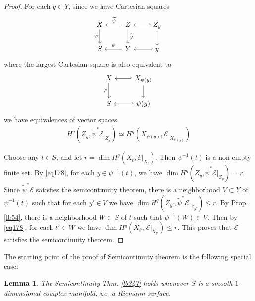 \documentclass[12pt,b5paper,notitlepage]{report}
\theoremstyle{definition}
\theoremstyle{plain}
\newtheorem{lm}[df]{Lemma}
\newcommand{\wtd}{\widetilde}
\newcommand{\scr}{\mathscr}
\numberwithin{equation}{section}
\begin{document}
\begin{proof}
For each $y\in Y$, since we have Cartesian squares
\begin{equation*}
\begin{tikzcd}
X \arrow[d, "\varphi"'] & Z \arrow[l, "\wtd\psi"'] \arrow[d, "\wtd\varphi"] & Z_y \arrow[d] \arrow[l,hook'] \\
S                       & Y \arrow[l, "\psi"']   &y \arrow[l,hook']                          
\end{tikzcd}
\end{equation*}
where the largest Cartesian square is also equivalent to
\begin{equation*}
\begin{tikzcd}
X \arrow[d, "\varphi"'] & X_{\psi(y)} \arrow[l, hook'] \arrow[d] \\
S                       & \psi(y) \arrow[l, hook']          
\end{tikzcd}
\end{equation*}
we have equivalences of vector spaces
\begin{align}
H^q(Z_y,\wtd\psi^*\scr E|_{Z_y})\simeq H^q(X_{\psi(y)},\scr E|_{X_{\psi(y)}})\label{eq178}
\end{align}

Choose any $t\in S$, and let $r=\dim H^q(X_t,\scr E|_{X_t})$. Then $\psi^{-1}(t)$ is a non-empty finite set. By \eqref{eq178}, for each $y\in\psi^{-1}(t)$, we have $\dim H^q(Z_y,\wtd\psi^*\scr E|_{Z_y})=r$. Since $\wtd\psi^*\scr E$ satisfies the semicontinuity theorem, there is a neighborhood $V\subset Y$ of $\psi^{-1}(t)$ such that for each $y'\in V$ we have $\dim H^q(Z_{y'},\wtd\psi^*\scr E|_{Z_{y'}})\leq r$. By Prop. \ref{lb54}, there is a neighborhood $W\subset S$ of $t$ such that $\psi^{-1}(W)\subset V$. Then by \eqref{eq178}, for each $t'\in W$ we have $\dim H^q(X_{t'},\scr E|_{X_{t'}})\leq r$. This proves that $\scr E$ satisfies the semicontinuity theorem.
\end{proof}



The starting point of the proof of Semicontinuity theorem is the following special case:


\begin{lm}\label{lb352}
The Semicontinuity Thm. \ref{lb347} holds whenever $S$ is a smooth $1$-dimensional complex manifold, i.e. a Riemann surface.
\end{lm}
\end{document}
